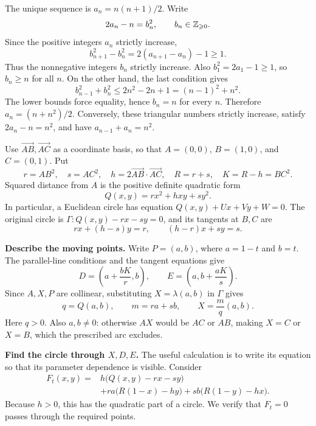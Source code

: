 \documentclass[12pt]{memoir}
\begin{document}
\begin{Ej}
The unique sequence is \(\boxed{a_n=n(n+1)/2}\).
Write
\[
    2a_n-n=b_n^2,\qquad b_n\in\mathbb{Z}_{\geqslant0}.
\]
Since the positive integers \(a_n\) strictly increase,
\[
    b_{n+1}^2-b_n^2=2(a_{n+1}-a_n)-1\geq1.
\]
Thus the nonnegative integers \(b_n\) strictly increase. Also
\(b_1^2=2a_1-1\geq1\), so \(b_n\geq n\) for all \(n\).
On the other hand, the last condition gives
\[
    b_{n-1}^2+b_n^2\leq2n^2-2n+1=(n-1)^2+n^2.
\]
The lower bounds force equality, hence \(b_n=n\) for every \(n\).
Therefore \(a_n=(n+n^2)/2\). Conversely, these triangular numbers
strictly increase, satisfy \(2a_n-n=n^2\), and have
\(a_{n-1}+a_n=n^2\).
\end{Ej}

\newpage
\begin{Ej}
Use \(\overrightarrow{AB},\overrightarrow{AC}\) as a coordinate basis,
so that \(A=(0,0)\), \(B=(1,0)\), and \(C=(0,1)\). Put
\[
    r=AB^2,\quad s=AC^2,\quad
    h=2\overrightarrow{AB}\cdot\overrightarrow{AC},\quad
    R=r+s,\quad K=R-h=BC^2.
\]
Squared distance from \(A\) is the positive definite quadratic form
\[
    Q(x,y)=rx^2+hxy+sy^2.
\]
In particular, a Euclidean circle has equation
\(Q(x,y)+Ux+Vy+W=0\). The original circle is
\(\Gamma:Q(x,y)-rx-sy=0\), and its tangents at \(B,C\) are
\[
    rx+(h-s)y=r,\qquad (h-r)x+sy=s.
\]

\textbf{Describe the moving points.}
Write \(P=(a,b)\), where \(a=1-t\) and \(b=t\). The parallel-line
conditions and the tangent equations give
\[
    D=\left(a+\frac{bK}{r},b\right),\qquad
    E=\left(a,b+\frac{aK}{s}\right).
\]
Since \(A,X,P\) are collinear, substituting \(X=\lambda(a,b)\) in
\(\Gamma\) gives
\[
    q=Q(a,b),\qquad m=ra+sb,\qquad
    X=\frac{m}{q}(a,b).
\]
Here \(q>0\). Also \(a,b\ne0\): otherwise \(AX\) would be \(AC\)
or \(AB\), making \(X=C\) or \(X=B\), which the prescribed arc excludes.

\textbf{Find the circle through \(X,D,E\).}
The useful calculation is to write its equation so that its parameter
dependence is visible. Consider
\[
\begin{split}
    F_t(x,y)={}&h\bigl(Q(x,y)-rx-sy\bigr)\\
        &+ra\bigl(R(1-x)-hy\bigr)
         +sb\bigl(R(1-y)-hx\bigr).
\end{split}
\]
Because \(h>0\), this has the quadratic part of a circle. We verify
that \(F_t=0\) passes through the required points.


\end{Ej}
\end{document}
